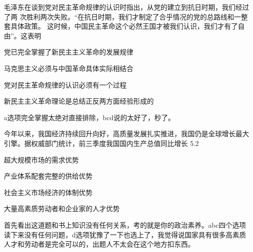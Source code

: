 \documentclass[lang=cn,blue,10pt,scheme=chinese,twocol]{zznote}
\begin{document}
\begin{exercise}毛泽东在谈到党对民主革命规律的认识时指出，从党的建立到抗日时期，我们经过了两 次胜利两次失败。“在抗日时期，我们才制定了合乎情况的党的总路线和一整套具体政策。 这时候，中国民主革命这个必然王国才被我们认识，我们才有了自由”。这表明
	\begin{choice}
		\item 党已完全掌握了新民主主义革命的发展规律
		\item 马克思主义必须与中国革命具体实际相结合
		\item 党对民主革命规律的认识必须有一个过程
		\item 新民主主义革命理论是总结正反两方面经验形成的
	\end{choice}
\end{exercise}
\begin{solution}
	a选项完全掌握太绝对直接排除，bcd说的太好了，秒了。
\end{solution}




\begin{exercise}今年以来，我国经济持续回升向好，高质量发展扎实推进，我国仍是全球增长最大 引擎。据权威部门统计，前三季度我国国内生产总值同比增长 5.2%
	\begin{choice}
		\item 超大规模市场的需求优势
		\item 产业体系配套完整的供给优势
		\item 社会主义市场经济的体制优势
		\item 大量高素质劳动者和企业家的人才优势
	\end{choice}
\end{exercise}
\begin{solution}
	首先看出这道题和书上知识没有任何关系，考的就是你的政治素养。abc四个选项读下来没有任何问题，d选项犹豫了一下也选上了，我觉得说国家具有很多高素质人才和劳动者是完全可以的，出题人不太会在这个地方扣东西。
\end{solution}
\end{document}
